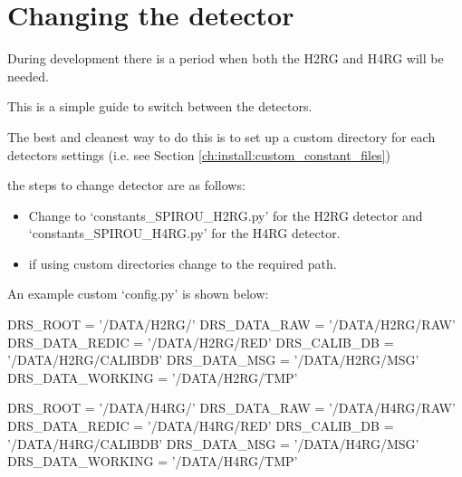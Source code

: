 \ifdevguide
\clearpage
\newpage
\section{Changing the detector}
\label{ch:install:detect_setup}

\noindent During development there is a period when both the H2RG and H4RG will be needed.

\noindent This is a simple guide to switch between the detectors.

\begin{note}
The best and cleanest way to do this is to set up a custom directory for each detectors settings (i.e. see Section \ref{ch:install:custom_constant_files})
\end{note}

\noindent the steps to change detector are as follows:
\begin{itemize}
	\item Change  to `constants\_SPIROU\_H2RG.py' for the H2RG detector and `constants\_SPIROU\_H4RG.py' for the H4RG detector.

	\item if using custom directories change  to the required path.
\end{itemize}

An example custom `config.py' is shown below:

\begin{textbox}[title={In "/home/user/spirouH2RG/config.py"}]
DRS_ROOT = '/DATA/H2RG/'
DRS_DATA_RAW = '/DATA/H2RG/RAW'
DRS_DATA_REDIC = '/DATA/H2RG/RED'
DRS_CALIB_DB = '/DATA/H2RG/CALIBDB'
DRS_DATA_MSG = '/DATA/H2RG/MSG'
DRS_DATA_WORKING = '/DATA/H2RG/TMP'
\end{textbox}

\begin{textbox}[title={In "/home/user/spirouH4RG/config.py"}]
DRS_ROOT = '/DATA/H4RG/'
DRS_DATA_RAW = '/DATA/H4RG/RAW'
DRS_DATA_REDIC = '/DATA/H4RG/RED'
DRS_CALIB_DB = '/DATA/H4RG/CALIBDB'
DRS_DATA_MSG = '/DATA/H4RG/MSG'
DRS_DATA_WORKING = '/DATA/H4RG/TMP'
\end{textbox}

\fi